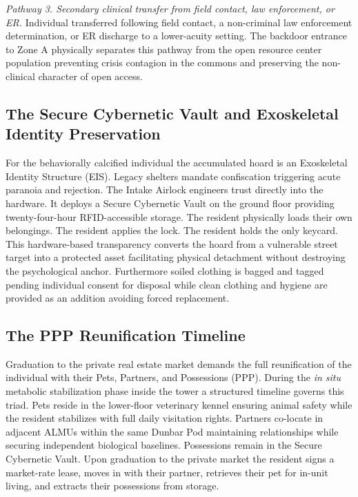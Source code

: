 \documentclass[12pt, letterpaper]{article}
\begin{document}
\textit{Pathway 3. Secondary clinical transfer from field contact, law enforcement, or ER.} Individual transferred following field contact, a non-criminal law enforcement determination, or ER discharge to a lower-acuity setting. The backdoor entrance to Zone A physically separates this pathway from the open resource center population preventing crisis contagion in the commons and preserving the non-clinical character of open access.

\subsection{The Secure Cybernetic Vault and Exoskeletal Identity Preservation}

For the behaviorally calcified individual the accumulated hoard is an Exoskeletal Identity Structure (EIS). Legacy shelters mandate confiscation triggering acute paranoia and rejection. The Intake Airlock engineers trust directly into the hardware. It deploys a Secure Cybernetic Vault on the ground floor providing twenty-four-hour RFID-accessible storage. The resident physically loads their own belongings. The resident applies the lock. The resident holds the only keycard. This hardware-based transparency converts the hoard from a vulnerable street target into a protected asset facilitating physical detachment without destroying the psychological anchor. Furthermore soiled clothing is bagged and tagged pending individual consent for disposal while clean clothing and hygiene are provided as an addition avoiding forced replacement.

\subsection{The PPP Reunification Timeline}

Graduation to the private real estate market demands the full reunification of the individual with their Pets, Partners, and Possessions (PPP). During the \textit{in situ} metabolic stabilization phase inside the tower a structured timeline governs this triad. Pets reside in the lower-floor veterinary kennel ensuring animal safety while the resident stabilizes with full daily visitation rights. Partners co-locate in adjacent ALMUs within the same Dunbar Pod maintaining relationships while securing independent biological baselines. Possessions remain in the Secure Cybernetic Vault. Upon graduation to the private market the resident signs a market-rate lease, moves in with their partner, retrieves their pet for in-unit living, and extracts their possessions from storage.
\end{document}
